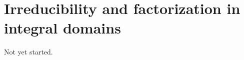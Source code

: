 \chapter{Irreducibility and factorization in integral domains}
\label{chap:irreducibility}

Not yet started.
